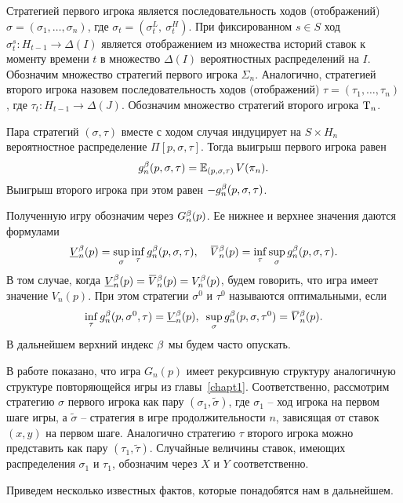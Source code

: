 {Стратегией первого игрока является последовательность ходов (отображений) $\sigma = (\sigma_1, \ldots, \sigma_n)$, где $\sigma_t = (\sigma^L_t,\ \sigma^H_t)$.
При фиксированном $s \in S$ ход $\sigma^s_t: H_{t-1} \rightarrow \Delta(I)$ является отображением из множества историй ставок к моменту времени $t$ в множество $\Delta(I)$ вероятностных распределений на $I$.
Обозначим множество стратегий первого игрока $\Sigma_n$.
Аналогично, стратегией второго игрока назовем последовательность ходов (отображений) $\tau = (\tau_1, \ldots, \tau_n)$, где $\tau_t: H_{t-1} \rightarrow \Delta(J)$.
Обозначим множество стратегий второго игрока $\mathrm{T}_n$.

Пара стратегий $(\sigma, \tau)$ вместе с ходом случая индуцирует на $S \times H_n$ вероятностное распределение $\Pi[p, \sigma, \tau]$.
Тогда выигрыш первого игрока равен
\[
  g^{\beta}_n(p, \sigma, \tau) = \operatorname{\mathbb{E}}_{( p, \sigma, \tau )} V(\pi_{n}).
\]
Выигрыш второго игрока при этом равен $-g^{\beta}_n(p, \sigma, \tau)$.

Полученную игру обозначим через $G^{\beta}_n(p)$. 
Ее нижнее и верхнее значения даются формулами
\begin{align*}
  \LV[\Co]{n}(p) = \sup_\sigma \inf_\tau g^\Co_n(p, \sigma, \tau), \quad
  \HV[\Co]{n}(p) = \inf_\tau \sup_\sigma g^\Co_n(p, \sigma, \tau).
\end{align*}
В том случае, когда $\LV[\Co]{n}(p) = \HV[\Co]{n}(p) = V^\Co_n(p)$, будем говорить, что игра имеет значение $V_n(p)$.
При этом стратегии $\sigma^0$ и $\tau^0$ называются оптимальными, если
\[
  \inf_\tau g^\Co_n(p, \sigma^0, \tau) = \LV[\Co]{n}(p), \enskip 
  \sup_\sigma g^\Co_n(p, \sigma, \tau^0) = \HV[\Co]{n}(p).
\]
В дальнейшем верхний индекс $\beta$ мы будем часто опускать.

В работе \cite{demeyer02} показано, что игра $G_n(p)$ имеет рекурсивную структуру аналогичную структуре повторяющейся игры из главы~\ref{chapt1}.
Соответственно, рассмотрим стратегию $\sigma$ первого игрока как пару $(\sigma_1, \tilde{\sigma})$, где $\sigma_1$ -- ход игрока на первом шаге игры, а $\tilde{\sigma}$ -- стратегия в игре продолжительности $n$, зависящая от ставок $(x, y)$ на первом шаге.
Аналогично стратегию $\tau$ второго игрока можно представить как пару $(\tau_1, \tilde{\tau})$.
Случайные величины ставок, имеющих распределения $\sigma_1$ и $\tau_1$, обозначим через $X$ и $Y$ соответственно.

Приведем несколько известных фактов, которые понадобятся нам в дальнейшем.

}
